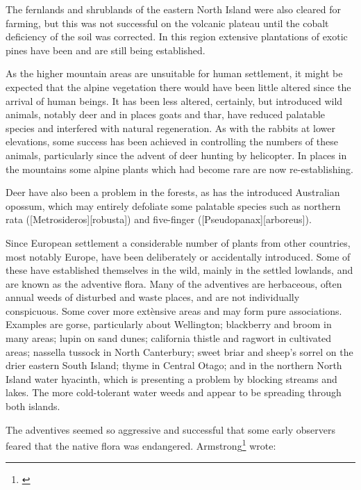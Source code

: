 The fernlands and shrublands of the eastern North Island were also cleared for farming, but this was not successful on the volcanic plateau until the cobalt deficiency of the soil was corrected.
In this region extensive plantations of exotic pines have been and are still being established.

As the higher mountain areas are unsuitable for human settlement, it might be expected that the alpine vegetation there would have been little altered since the arrival of human beings.
It has been less altered, certainly, but introduced wild animals, notably deer and in places goats and thar, have reduced palatable species and interfered with natural regeneration.
As with the rabbits at lower elevations, some success has been achieved in controlling the numbers of these animals, particularly since the advent of deer hunting by helicopter.
In places in the mountains some alpine plants which had become rare are now re-establishing.

Deer have also been a problem in the forests, as has the introduced Australian opossum, which may entirely defoliate some palatable species such as northern rata ([Metrosideros][robusta]) and five-finger ([Pseudopanax][arboreus]).

Since European settlement a considerable number of plants from other countries, most notably Europe, have been deliberately or accidentally introduced.
Some of these have established themselves in the wild, mainly in the settled lowlands, and are known as the adventive flora.
Many of the adventives are herbaceous, often annual weeds of disturbed and waste places, and are not individually conspicuous.
Some cover more extènsive areas and may form pure associations.
Examples are gorse, particularly about Wellington; blackberry and broom in many areas; lupin on sand dunes; california thistle and ragwort in cultivated areas; nassella tussock in North Canterbury; sweet briar and sheep's sorrel on the drier eastern South Island; thyme in Central Otago; and in the northern North Island water hyacinth, which is presenting a problem by blocking streams and lakes.
The more cold-tolerant water weeds  and  appear to be spreading through both islands.

The adventives seemed so aggressive and successful that some early observers feared that the native flora was endangered.
Armstrong\footnote{\cite{armstrong1872naturalised}} wrote:


